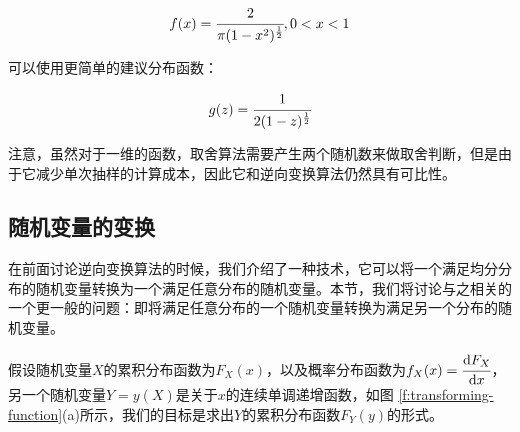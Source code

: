 \begin{equation}
	f(x)= \cfrac{2}{\pi(1-x^2)^{ \frac{1}{2}}},0<x<1
\end{equation}

\noindent 可以使用更简单的建议分布函数：

\begin{equation}
	g(z)= \cfrac{1}{2(1-z)^{ \frac{1}{2}}}
\end{equation}

\noindent 注意，虽然对于一维的函数，取舍算法需要产生两个随机数来做取舍判断，但是由于它减少单次抽样的计算成本，因此它和逆向变换算法仍然具有可比性。



\subsection{随机变量的变换}\label{sec:Transformation-of-Random-Variables}
在前面讨论逆向变换算法的时候，我们介绍了一种技术，它可以将一个满足均分分布的随机变量转换为一个满足任意分布的随机变量。本节，我们将讨论与之相关的一个更一般的问题：即将满足任意分布的一个随机变量转换为满足另一个分布的随机变量。

假设随机变量$X$的累积分布函数为$F_X(x)$，以及概率分布函数为$f_X(x)= \cfrac{{\rm d}F_X}{{\rm d}x}$，另一个随机变量$Y=y(X)$是关于$x$的连续单调递增函数，如图 \ref{f:transforming-function}(a)所示，我们的目标是求出$Y$的累积分布函数$F_Y(y)$的形式。

